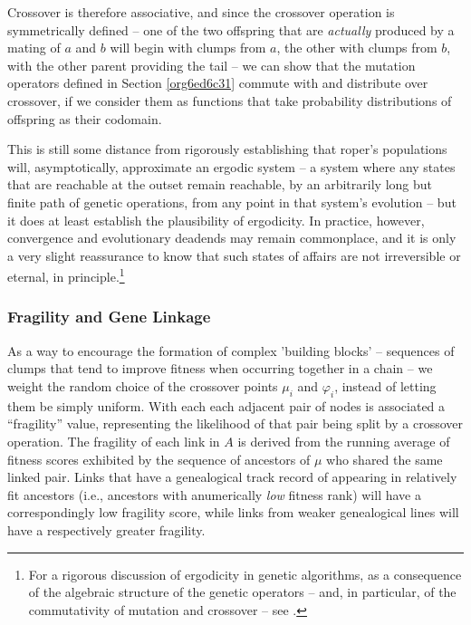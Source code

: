 \documentclass[12pt,glossary]{dalthesis}
\begin{document}
Crossover is therefore associative, and since the crossover operation is symmetrically
defined -- one of the two offspring that are \emph{actually} produced by a mating of \(a\) 
and \(b\) will begin with clumps from \(a\), the other with clumps from \(b\), with the other
parent providing the tail -- we can show that the mutation operators defined in
Section \ref{org6ed6c31} commute with and distribute over crossover, if we consider
them as functions that take probability distributions of offspring as their codomain. 

This is still some distance from rigorously establishing that \gls{roper}'s populations
will, asymptotically, approximate an ergodic system -- a system where any states that
are reachable at the outset remain reachable, by an arbitrarily long but
finite path of genetic operations, from any point in that system's evolution -- but
it does at least establish the plausibility of ergodicity. In practice, however,
convergence and evolutionary deadends may remain commonplace, and it is only a very
slight reassurance to know that such states of affairs are not irreversible or 
eternal, in principle.\footnote{For a rigorous discussion of ergodicity in genetic algorithms, as a consequence of the algebraic structure of the genetic operators -- and, in particular, of the commutativity of mutation and crossover -- see \cite{schmitt01}.}


\subsubsection{Fragility and Gene Linkage}
\label{sec:org95f781a}
\label{org684bf02}

As a way to encourage the formation of complex 'building blocks' -- sequences of
clumps that tend to improve fitness when occurring together in a chain -- we
weight the random choice of the crossover points \(\mu_i\) and \(\varphi_i\),
instead of letting them be simply uniform. With each each adjacent pair of nodes
is associated a ``fragility'' value, representing the likelihood of that
pair being split by a crossover operation. The fragility of each link in \(A\) is
derived from the running average of fitness scores exhibited by the sequence of
ancestors of \(\mu\) who shared the same linked pair. Links that have a genealogical
track record of appearing in relatively fit ancestors (i.e., ancestors with anumerically 
\emph{low} fitness rank) will have a correspondingly low fragility score, while links
from weaker genealogical lines will have a respectively greater fragility.
\end{document}
